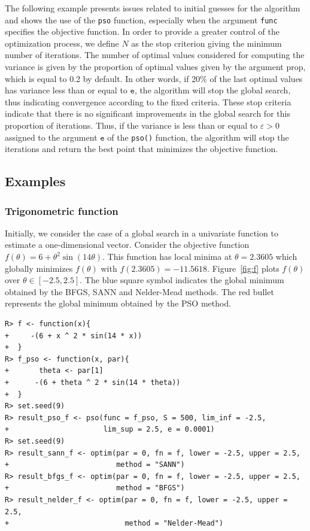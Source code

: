 \documentclass[10pt,letterpaper]{article}
\begin{document}
The following example presents issues related to  initial guesses for the algorithm
and shows the use of the {\tt pso} function, especially when the argument {\tt func} specifies the objective function.
In order to provide a greater control of the optimization process, we define $N$ as the stop criterion giving the minimum number of iterations.
The number of optimal values considered for computing  the variance is given by the proportion of optimal values given by the argument prop,
which is equal to 0.2 by default.
In other words, if 20\% of the last optimal values has variance less than or equal to $\texttt{e}$, the algorithm will stop
the global search, thus indicating convergence according to the fixed criteria.
These stop criteria indicate that there is no significant improvements
in the global search for this proportion of iterations.
Thus, if the variance is less than or equal to $\varepsilon > 0$ assigned to the
argument $\texttt{e}$ of the \texttt{pso()} function, the algorithm will stop the iterations and return the best point that minimizes the objective
function.

\subsection{Examples}

\subsubsection{Trigonometric function}

Initially, we consider the case of a global search in a univariate function to estimate a one-dimensional vector.
Consider the objective function $f(\theta) = 6 + \theta^2 \sin(14\theta)$.
This function has  local minima at $\theta= 2.3605$ which globally minimizes $f(\theta)$ with $f(2.3605) = -11.5618$.
Figure~\ref{fig:f} plots $f(\theta)$ over $\theta \in [-2.5, 2.5]$.
The blue square symbol indicates the global minimum obtained by the
BFGS, SANN and Nelder-Mead methods.
The red bullet represents the global minimum obtained by the PSO method.

\begin{verbatim}
R> f <- function(x){
+     -(6 + x ^ 2 * sin(14 * x))
+  }
R> f_pso <- function(x, par){
+	    theta <- par[1]
+ 	   -(6 + theta ^ 2 * sin(14 * theta))
+  }
R> set.seed(9)
R> result_pso_f <- pso(func = f_pso, S = 500, lim_inf = -2.5,
+                      lim_sup = 2.5, e = 0.0001)
R> set.seed(9)
R> result_sann_f <- optim(par = 0, fn = f, lower = -2.5, upper = 2.5,
+                         method = "SANN")
R> result_bfgs_f <- optim(par = 0, fn = f, lower = -2.5, upper = 2.5,
+                         method = "BFGS")
R> result_nelder_f <- optim(par = 0, fn = f, lower = -2.5, upper = 2.5,
+                           method = "Nelder-Mead")
\end{verbatim}
\end{document}
